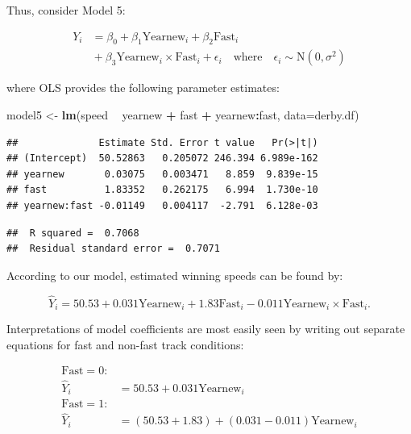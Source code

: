 \documentclass[
]{krantz}
\newenvironment{Shaded}{\begin{snugshade}}{\end{snugshade}}
\newcommand{\DataTypeTok}[1]{\textcolor[rgb]{0.27,0.27,0.27}{#1}}
\newcommand{\KeywordTok}[1]{\textcolor[rgb]{0.27,0.27,0.27}{\textbf{#1}}}
\newcommand{\NormalTok}[1]{#1}
\newcommand{\OperatorTok}[1]{\textcolor[rgb]{0.43,0.43,0.43}{\textbf{#1}}}
\newcommand{\StringTok}[1]{\textcolor[rgb]{0.5,0.5,0.5}{#1}}
\begin{document}
Thus, consider Model 5:

\begin{equation*}
\begin{split}
Y_{i}&= \beta_{0}+\beta_{1}\textrm{Yearnew}_{i}+\beta_{2}\textrm{Fast}_{i} \\
      &{}+\beta_{3}\textrm{Yearnew}_{i}\times\textrm{Fast}_{i}+\epsilon_{i}\quad \textrm{where}\quad \epsilon_{i}\sim \textrm{N}(0,\sigma^2)
\end{split}
\end{equation*}

where OLS provides the following parameter estimates:

\begin{Shaded}
\begin{Highlighting}[]
\NormalTok{model5 <-}\StringTok{ }\KeywordTok{lm}\NormalTok{(speed }\OperatorTok{~}\StringTok{ }\NormalTok{yearnew }\OperatorTok{+}\StringTok{ }\NormalTok{fast }\OperatorTok{+}\StringTok{ }\NormalTok{yearnew}\OperatorTok{:}\NormalTok{fast, }
             \DataTypeTok{data=}\NormalTok{derby.df)}
\end{Highlighting}
\end{Shaded}

\begin{verbatim}
##              Estimate Std. Error t value   Pr(>|t|)
## (Intercept)  50.52863   0.205072 246.394 6.989e-162
## yearnew       0.03075   0.003471   8.859  9.839e-15
## fast          1.83352   0.262175   6.994  1.730e-10
## yearnew:fast -0.01149   0.004117  -2.791  6.128e-03
\end{verbatim}

\begin{verbatim}
##  R squared =  0.7068 
##  Residual standard error =  0.7071
\end{verbatim}

According to our model, estimated winning speeds can be found by:

\begin{equation}
 \hat{Y}_{i}=50.53+0.031\textrm{Yearnew}_{i}+1.83\textrm{Fast}_{i}-0.011\textrm{Yearnew}_{i}\times\textrm{Fast}_{i}.
\label{eq:model5est}
\end{equation}

Interpretations of model coefficients are most easily seen by writing out separate equations for fast and non-fast track conditions:

\begin{align*}
 \textrm{Fast}=0: & \\
 \hat{Y}_{i} &= 50.53+0.031\textrm{Yearnew}_{i} \\
 \textrm{Fast}=1: & \\
 \hat{Y}_{i} &= (50.53+1.83)+(0.031-0.011)\textrm{Yearnew}_{i}
 \end{align*}
\end{document}
